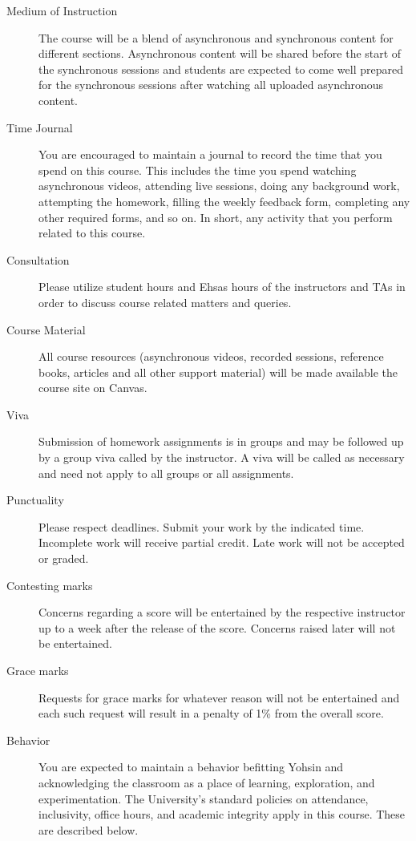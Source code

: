 \documentclass[a4paper]{article}
\begin{document}
\begin{description}
\item[Medium of Instruction] The course will be a blend of asynchronous and synchronous content for different sections. Asynchronous content will be shared before the start of the synchronous sessions and students are expected to come well prepared for the synchronous sessions after watching all uploaded asynchronous content.
\item[Time Journal] You are encouraged to maintain a journal to record the time that you spend on this course. This includes the time you spend watching asynchronous videos, attending live sessions, doing any background work, attempting the homework, filling the weekly feedback form, completing any other required forms, and so on. In short, any activity that you perform related to this course. 
\item[Consultation] Please utilize student hours and Ehsas hours of the instructors and TAs in order to discuss course related matters and queries.
\item[Course Material] All course resources (asynchronous videos, recorded sessions, reference books, articles and all other support material) will be made available the course site on Canvas.
\item[Viva] Submission of homework assignments is in groups and may be followed up by a group viva called by the instructor. A viva will be called as necessary and need not apply to all groups or all assignments.
\item[Punctuality] Please respect deadlines. Submit your work by the indicated time. Incomplete work will receive partial credit. Late work will not be accepted or graded. 
\item[Contesting marks] Concerns regarding a score will be entertained by the respective instructor up to a week after the release of the score. Concerns raised later will not be entertained. 
\item[Grace marks] Requests for grace marks for whatever reason will not be entertained and each such request will result in a penalty of 1\% from the overall score. 
\item[Behavior] You are expected to maintain a behavior befitting Yohsin and acknowledging the classroom as a place of learning, exploration, and experimentation. The University’s standard policies on attendance, inclusivity, office hours, and academic integrity apply in this course. These are described below. 
\end{description}
\end{document}
